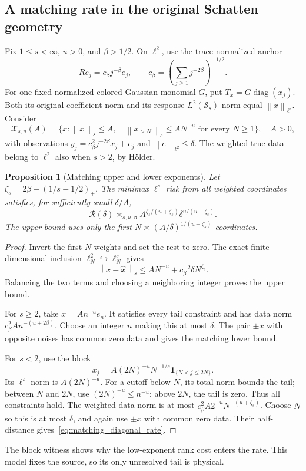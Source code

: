 \documentclass[11pt,a4paper]{amsart}
\numberwithin{equation}{section}
\newtheorem{proposition}[theorem]{Proposition}
\theoremstyle{definition}
\theoremstyle{remark}
\newcommand{\Sch}{\mathcal S}
\DeclareMathOperator{\diag}{diag}
\newcommand{\norm}[1]{\left\lVert#1\right\rVert}
\begin{document}
\subsection{A matching rate in the original Schatten geometry}
Fix $1\le s<\infty$, $u>0$, and $\beta>1/2$. On $\ell^2$, use the trace-normalized anchor
\[
 Re_j=c_\beta j^{-\beta}e_j,
 \qquad c_\beta=\left(\sum_{j\ge1}j^{-2\beta}\right)^{-1/2}.
\]
For one fixed normalized colored Gaussian monomial $G$, put
$T_x=G\diag(x_j)$. Both its original coefficient norm and its response $L^2(\Sch_s)$ norm equal $\norm x_{\ell^s}$. Consider
\[
 \mathcal X_{s,u}(A)=\{x:\norm x_s\le A,\quad
       \norm{x_{>N}}_s\le AN^{-u}\text{ for every }N\ge1\},\quad A>0,
\]
with observations $y_j=c_\beta^2j^{-2\beta}x_j+e_j$ and $\norm e_{\ell^2}\le\delta$.
The weighted true data belong to $\ell^2$ also when $s>2$, by H\"older.

\begin{proposition}[Matching upper and lower exponents]\label{prop:matching_diagonal_rate}
Let $\zeta_s=2\beta+(1/s-1/2)_+$. The minimax $\ell^s$ risk from all weighted coordinates satisfies, for sufficiently small $\delta/A$,
\begin{equation}\label{eq:matching_diagonal_rate}
 \mathcal R(\delta)\asymp_{s,u,\beta}
 A^{\zeta_s/(u+\zeta_s)}\delta^{u/(u+\zeta_s)}.
\end{equation}
The upper bound uses only the first
$N\asymp(A/\delta)^{1/(u+\zeta_s)}$ coordinates.
\end{proposition}
\begin{proof}
Invert the first $N$ weights and set the rest to zero. The exact finite-dimensional inclusion $\ell^2_N\hookrightarrow\ell^s_N$ gives
\[
 \norm{x-\widehat x}_s\le AN^{-u}+c_\beta^{-2}\delta N^{\zeta_s}.
\]
Balancing the two terms and choosing a neighboring integer proves the upper bound.

For $s\ge2$, take $x=An^{-u}e_n$. It satisfies every tail constraint and has data norm $c_\beta^2An^{-(u+2\beta)}$. Choose an integer $n$ making this at most $\delta$. The pair $\pm x$ with opposite noises has common zero data and gives the matching lower bound.

For $s<2$, use the block
\[
 x_j=A(2N)^{-u}N^{-1/s}\mathbf1_{\{N<j\le2N\}}.
\]
Its $\ell^s$ norm is $A(2N)^{-u}$. For a cutoff below $N$, its total norm bounds the tail; between $N$ and $2N$, use $(2N)^{-u}\le n^{-u}$; above $2N$, the tail is zero. Thus all constraints hold. The weighted data norm is at most
$c_\beta^2A2^{-u}N^{-(u+\zeta_s)}$.
Choose $N$ so this is at most $\delta$, and again use $\pm x$ with common zero data. Their half-distance gives~\eqref{eq:matching_diagonal_rate}.
\end{proof}
The block witness shows why the low-exponent rank cost enters the rate. This model fixes the source, so its only unresolved tail is physical.
\end{document}
